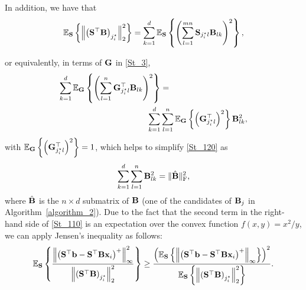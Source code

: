 \documentclass[12pt,draftcls,onecolumn]{IEEEtran}
\begin{document}
In addition, we have that
\begin{equation}
\label{St_1020}
\begin{aligned}
\mathbb{E}_{\mbS}\left\{\left\|\left(\mbS^{\top} \mbB\right)_{j^{\star}_{i}}\right\|_2^2\right\}=\sum_{k=1}^{d} \mathbb{E}_{\mbS}\left\{\left(\sum_{l=1}^{m n} \mbS_{j_{i}^{\star}l}\mbB_{l k}\right)^2\right\},
\end{aligned}
\end{equation}

or equivalently, in terms of $\mathbf{G}$ in \eqref{St_3},
\begin{equation}
\label{St_120}
\begin{aligned}
\sum_{k=1}^{d} \mathbb{E}_{\mbG}\left\{\left(\sum_{l=1}^{n} \mbG^{\top}_{j_{i}^{\star}l} \mbB_{l k}\right)^2\right\}&=\\
\sum_{k=1}^{d} &\sum_{l=1}^{n} \mathbb{E}_{\mbG}\left\{\left(\mbG^{\top}_{j_{i}^{\star} l}\right)^{2}\right\} \mbB^{2}_{l k},
\end{aligned}
\end{equation}
with $\mathbb{E}_{\mathbf{G}}\left\{\left(\mathbf{G}^{\top}_{j_{i}^{\star} l}\right)^{2}\right\}=1$, which helps to simplify \eqref{St_120} as
\begin{equation}
\label{St_1200}
\begin{aligned}
\sum_{k=1}^{d}\sum_{l=1}^{n} \mbB^{2}_{l k }=\|\hat{\mbB}\|_{\mathrm{F}}^2,
\end{aligned}
\end{equation}
where $\hat{\mathbf{B}}$ is the $n\times d$ submatrix of $\mathbf{B}$ (one of the candidates of $\mathbf{B}_{j}$ in Algorithm~\ref{algorithm_2}). Due to the fact that the second term in the right-hand side of \eqref{St_110} is an expectation over the convex function $f(x,y)=x^{2}/y$, we can apply Jensen's inequality as follows:
\begin{equation}
\label{St_1300}
\begin{aligned}
\mathbb{E}_{\mbS}\left\{ \frac{\left\|\left(\mbS^{\top} \mbb-\mbS^{\top}\mbB\mbx_i\right)^{+} \right\|_{\infty}^2}{\left\|\left(\mbS^{\top} \mbB\right)_{j^{\star}_{i}}\right\|_2^2}\right\} \geq \frac{\left(\mathbb{E}_{\mbS}\left\{\left\|\left(\mbS^{\top} \mbb-\mbS^{\top}\mbB\mbx_i\right)^{+} \right\|_{\infty}\right\}\right)^2}{\mathbb{E}_{\mbS}\left\{\left\|\left(\mbS^{\top} \mbB\right)_{j^{\star}_{i}}\right\|_2^2\right\}}.
\end{aligned}
\end{equation}
\end{document}
